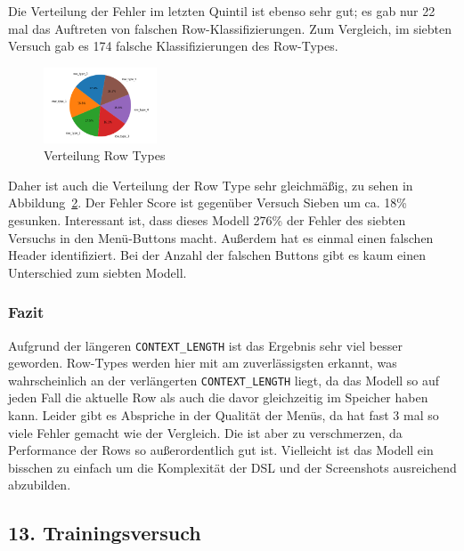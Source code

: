 \documentclass[pdftex,a4paper,halfparskip, article]{scrartcl}
\begin{document}
\begin{figure}
\begin{minipage}{.33\textwidth}
  \label{fig:fehler_schlechteste20_bin15}
\end{minipage}
\end{figure}

Die Verteilung der Fehler im letzten Quintil ist ebenso sehr gut; es gab nur 22 mal das Auftreten von falschen Row-Klassifizierungen. Zum Vergleich, im siebten Versuch gab es 174 falsche Klassifizierungen des Row-Types.

\begin{figure}[h]
\centering
\includegraphics[width=0.3\textwidth]{predictions_bin15_predicted_row_type_distribution}
\caption{Verteilung Row Types}
\label{fig:bin15_row_type}
\end{figure}

Daher ist auch die Verteilung der Row Type sehr gleichmäßig, zu sehen in Abbildung~\ref{fig:bin15_row_type}. 
Der Fehler Score ist gegenüber Versuch Sieben um ca. 18\% gesunken. 
Interessant ist, dass dieses Modell 276\% der Fehler des siebten Versuchs in den Menü-Buttons macht. Außerdem hat es einmal einen falschen Header identifiziert. Bei der Anzahl der falschen Buttons gibt es kaum einen Unterschied zum siebten Modell.

\subsubsection*{Fazit}
Aufgrund der längeren \texttt{CONTEXT\_LENGTH} ist das Ergebnis sehr viel besser geworden. Row-Types werden hier mit am zuverlässigsten erkannt, was wahrscheinlich an der verlängerten \texttt{CONTEXT\_LENGTH} liegt, da das Modell so auf jeden Fall die aktuelle Row als auch die davor gleichzeitig im Speicher haben kann. Leider gibt es Abspriche in der Qualität der Menüs, da hat fast 3 mal so viele Fehler gemacht wie der Vergleich. Die ist aber zu verschmerzen, da Performance der Rows so außerordentlich gut ist. Vielleicht ist das Modell ein bisschen zu einfach um die Komplexität der DSL und der Screenshots ausreichend abzubilden. 

\subsection{13. Trainingsversuch}
\end{document}
